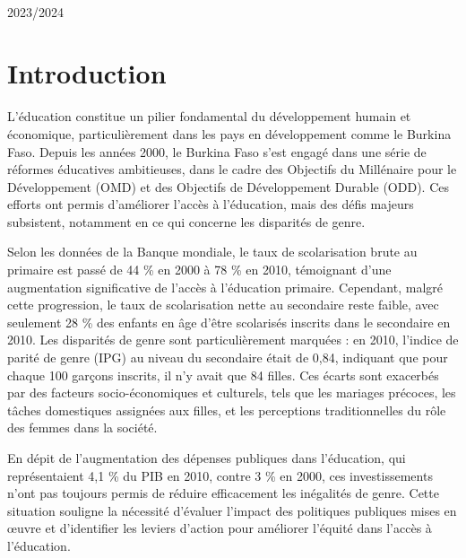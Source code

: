 \documentclass[a4paper,12pt]{report}
\begin{document}
\begin{titlepage}
\begin{center}
\color{black}
\centering
\begin{tabular}{lll}

\end{tabular}

\vfill

{\large \color{orange!80!black}{Année universitaire}\\ \color{blue!80!black}2023/2024}
\end{center}
\end{titlepage}
\newpage
\tableofcontents
\newpage


\chapter*{Introduction}
L’éducation constitue un pilier fondamental du développement humain et économique, particulièrement dans les pays en développement comme le Burkina Faso. Depuis les années 2000, le Burkina Faso s’est engagé dans une série de réformes éducatives ambitieuses, dans le cadre des Objectifs du Millénaire pour le Développement (OMD) et des Objectifs de Développement Durable (ODD). Ces efforts ont permis d’améliorer l’accès à l’éducation, mais des défis majeurs subsistent, notamment en ce qui concerne les disparités de genre.

Selon les données de la Banque mondiale, le taux de scolarisation brute au primaire est passé de 44 \% en 2000 à 78 \% en 2010, témoignant d’une augmentation significative de l’accès à l’éducation primaire. Cependant, malgré cette progression, le taux de scolarisation nette au secondaire reste faible, avec seulement 28 \% des enfants en âge d’être scolarisés inscrits dans le secondaire en 2010. Les disparités de genre sont particulièrement marquées : en 2010, l’indice de parité de genre (IPG) au niveau du secondaire était de 0,84, indiquant que pour chaque 100 garçons inscrits, il n'y avait que 84 filles. Ces écarts sont exacerbés par des facteurs socio-économiques et culturels, tels que les mariages précoces, les tâches domestiques assignées aux filles, et les perceptions traditionnelles du rôle des femmes dans la société.

En dépit de l’augmentation des dépenses publiques dans l’éducation, qui représentaient 4,1 \% du PIB en 2010, contre 3 \% en 2000, ces investissements n’ont pas toujours permis de réduire efficacement les inégalités de genre. Cette situation souligne la nécessité d’évaluer l'impact des politiques publiques mises en œuvre et d'identifier les leviers d'action pour améliorer l'équité dans l'accès à l'éducation.
\end{document}
